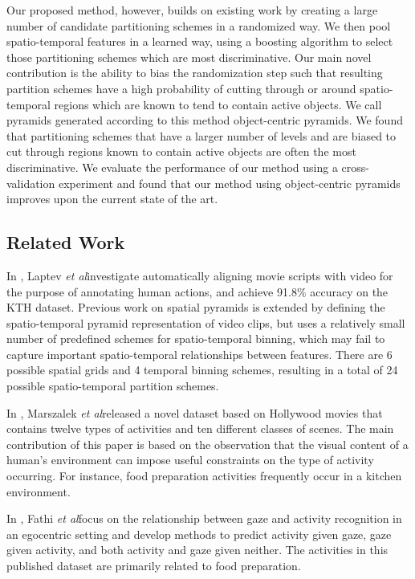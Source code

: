 \documentclass{bmvc2k}
\def\etal{\emph{et al}\bmvaOneDot}
\begin{document}
  Our proposed method, however, builds on existing work by creating a large number
  of candidate partitioning schemes in a randomized way. 
  We then pool spatio-temporal features in a
  learned way, using a boosting algorithm to select those partitioning schemes which are most discriminative.
  Our main novel contribution is
  the ability to bias the randomization step such that 
  resulting partition schemes have a high probability of cutting through or around
  spatio-temporal regions which are known to tend to contain active objects.
  We call pyramids generated according to this method object-centric
  pyramids.
  We found that partitioning schemes that have a larger number of levels and
  are biased to cut through regions known to contain active
  objects are often the most discriminative.
  We evaluate the performance of our method using a cross-validation
  experiment and found that our method using object-centric pyramids improves
  upon the current state of the art.

\subsection{Related Work}


	In \cite{Laptev08}, Laptev \etal investigate automatically aligning movie scripts with
	video for the purpose of annotating human actions, and achieve 91.8\%
  accuracy on the KTH dataset. 
  Previous work on spatial pyramids \cite{Bosch07, Lazebnik06} is
  extended
  by defining the spatio-temporal pyramid representation of video clips, but uses a
  relatively small number of predefined schemes for spatio-temporal binning,
  which may fail to capture important spatio-temporal relationships between
  features. There are 6 possible spatial grids and 4 temporal binning
  schemes, resulting in a total of 24 possible spatio-temporal partition
  schemes. 
	
	In \cite{Marszalek09}, Marszalek \etal released a novel dataset based on
	Hollywood movies that contains twelve types of activities and ten
	different classes of scenes. The main contribution of this paper is based
	on the observation that the visual content of a human's environment can
	impose useful constraints on the type of activity occurring. For instance,
	food preparation activities frequently occur in a kitchen environment. 
	
	In \cite{Fathi12}, Fathi \etal focus on the relationship between gaze and
	activity recognition in an egocentric setting and develop methods to
	predict activity given gaze, gaze given activity, and both
	activity and gaze given neither. The activities in this
	published dataset are primarily related to food preparation. 
	
\end{document}
